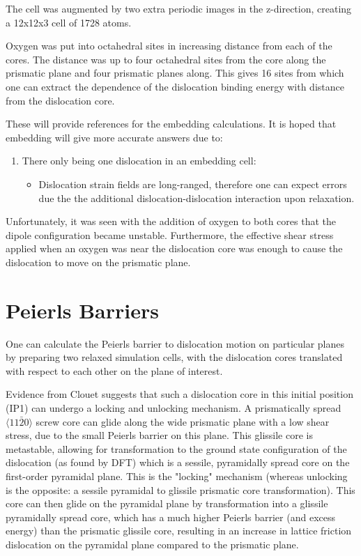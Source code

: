\documentclass[11pt]{article}
\begin{document}
The cell was augmented by two extra periodic images in the
z-direction, creating a 12x12x3 cell of 1728 atoms. 

Oxygen was put into octahedral sites in increasing distance
from each of the cores. The distance was up to four octahedral sites
from the core along the prismatic plane and four prismatic planes
along. This gives 16 sites from which one can extract the
dependence of the dislocation binding energy with distance from the
dislocation core.

These will provide references for the embedding calculations. It is
hoped that embedding will give more accurate answers due to:
\begin{enumerate}
\item There only being one dislocation in an embedding cell:
\begin{itemize}
\item Dislocation strain fields are long-ranged, therefore one can
expect errors due the the additional dislocation-dislocation
interaction upon relaxation.
\end{itemize}
\end{enumerate}


Unfortunately, it was seen with the addition of oxygen to both
cores that the dipole configuration became unstable. Furthermore,
the effective shear stress applied when an oxygen was near the
dislocation core was enough to cause the dislocation to move on the
prismatic plane. 


\section{Peierls Barriers}
\label{sec:org3e06591}

One can calculate the Peierls barrier to dislocation motion on
particular planes by preparing two relaxed simulation cells, with
the dislocation cores translated with respect to each other on the
plane of interest. 

Evidence from Clouet \cite{Clouet2015} suggests that such a
dislocation core in this initial position (IP1) can undergo a
locking and unlocking mechanism. A prismatically spread \(\langle
  11\bar{2}0 \rangle\) screw core can glide along the wide prismatic
plane with a low shear stress, due to the small Peierls barrier on
this plane. This glissile core is metastable, allowing for
transformation to the ground state configuration of the dislocation
(as found by DFT) which is a sessile, pyramidally spread core on the
first-order pyramidal plane. This is the "locking" mechanism
(whereas unlocking is the opposite: a sessile pyramidal to glissile
prismatic core transformation). This core can then glide on the
pyramidal plane by transformation into a glissile pyramidally spread
core, which has a much higher Peierls barrier (and excess energy)
than the prismatic glissile core, resulting in an increase in
lattice friction dislocation on the pyramidal plane compared to the
prismatic plane.
\end{document}
